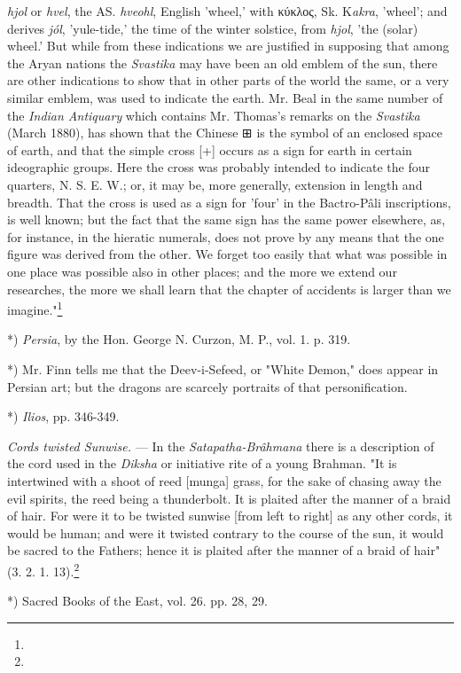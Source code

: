 \documentclass[a4paper, 11pt, oneside, polutonikogreek, english]{article}
\begin{document}
\emph{hjol} or \emph{hvel}, the AS. \emph{hveohl}, English 'wheel,' with κύκλος, Sk. K\emph{akra}, 'wheel'; and derives \emph{jól}, 'yule-tide,' the time of the winter solstice, from \emph{hjol}, 'the (solar) wheel.' But while from these indications we are justified in supposing that among the Aryan nations the \emph{Svastika} may have been an old emblem of the sun, there are other indications to show that in other parts of the world the same, or a very similar emblem, was used to indicate the earth. Mr. Beal in the same number of the \emph{Indian Antiquary} which contains Mr. Thomas's remarks on the \emph{Svastika} (March 1880), has shown that the Chinese ⊞ is the symbol of an enclosed space of earth, and that the simple cross [+] occurs as a sign for earth in certain ideographic groups. Here the cross was probably intended to indicate the four quarters, N. S. E. W.; or, it may be, more generally, extension in length and breadth. That the cross is used as a sign for 'four' in the Bactro-Pâli inscriptions, is well known; but the fact that the same sign has the same power elsewhere, as, for instance, in the hieratic numerals, does not prove by any means that the one figure was derived from the other. We forget too easily that what was possible in one place was possible also in other places; and the more we extend our researches, the more we shall learn that the chapter of accidents is larger than we imagine."\footnote{}

*) \emph{Persia}, by the Hon. George N. Curzon, M. P., vol. 1. p. 319.

*) Mr. Finn tells me that the Deev-i-Sefeed, or "White Demon," does appear in Persian art; but the dragons are scarcely portraits of that personification.

*) \emph{Ilios}, pp. 346-349.

\emph{Cords twisted Sunwise.} --- In the \emph{Satapatha-Brâhmana} there is a description of the cord used in the \emph{Diksha} or initiative rite of a young Brahman. "It is intertwined with a shoot of reed [munga] grass, for the sake of chasing away the evil spirits, the reed being a thunderbolt. It is plaited after the manner of a braid of hair. For were it to be twisted sunwise [from left to right] as any other cords, it would be human; and were it twisted contrary to the course of the sun, it would be sacred to the Fathers; hence it is plaited after the manner of a braid of hair" (3. 2. 1. 13).\footnote{}

*) Sacred Books of the East, vol. 26. pp. 28, 29.
\end{document}
